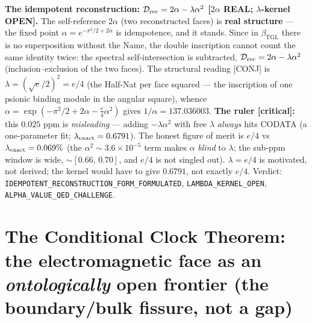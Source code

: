 \documentclass[11pt]{article}
\newcommand{\bTGL}{\beta_{\mathrm{TGL}}}\newcommand{\Msun}{M_{\odot}}\newcommand{\TGL}{\mathrm{TGL}}
\theoremstyle{definition}\newtheorem{deriv}{Derivation}
\begin{document}
\textbf{The idempotent reconstruction: $\mathcal D_{\rm rec}=2\alpha-\lambda\alpha^2$ \textsf{[$2\alpha$ REAL; $\lambda$-kernel OPEN]}.} The self-reference $2\alpha$ (two reconstructed faces) is \textbf{real structure} --- the fixed point $\alpha=e^{-\pi^2/2+2\alpha}$ is idempotence, and it stands. Since in $\bTGL$ there is no superposition without the Name, the double inscription cannot count the same identity twice: the spectral self-intersection is subtracted, $\mathcal D_{\rm rec}=2\alpha-\lambda\alpha^2$ (inclusion--exclusion of the two faces). The structural reading \textsf{[CONJ]} is $\lambda=(\sqrt e/2)^2=e/4$ (the Half-Nat per face squared --- the inscription of one psionic binding module in the angular square), whence $\alpha=\exp(-\pi^2/2+2\alpha-\tfrac e4\alpha^2)$ gives $1/\alpha=137.036003$. \textbf{The ruler \textsf{[critical]}:} this $0.025$ ppm is \emph{misleading} --- adding $-\lambda\alpha^2$ with free $\lambda$ \emph{always} hits CODATA (a one-parameter fit; $\lambda_{\rm exact}=0.6791$). The honest figure of merit is $e/4$ vs $\lambda_{\rm exact}=0.069\%$ (the $\alpha^2\sim3.6\times10^{-5}$ term makes $\alpha$ \emph{blind} to $\lambda$; the sub-ppm window is wide, $\sim[0.66,\,0.70]$, and $e/4$ is not singled out). $\lambda=e/4$ is motivated, not derived; the kernel would have to give $0.6791$, not exactly $e/4$. Verdict: \texttt{IDEMPOTENT\_RECONSTRUCTION\_FORM\_FORMULATED}, \texttt{LAMBDA\_KERNEL\_OPEN}, \texttt{ALPHA\_VALUE\_QED\_CHALLENGE}.

\section{The Conditional Clock Theorem: the electromagnetic face as an \emph{ontologically} open frontier (the boundary/bulk fissure, not a gap)}
\end{document}
